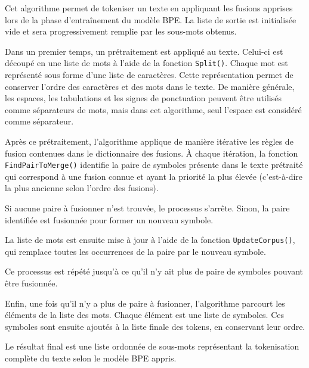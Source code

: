 \documentclass[12pt,a4paper]{report}
\begin{document}
Cet algorithme permet de tokeniser un texte en appliquant les fusions apprises lors de la phase d’entraînement du modèle BPE. La liste de sortie est initialisée vide et sera progressivement remplie par les sous-mots obtenus.

Dans un premier temps, un prétraitement est appliqué au texte. Celui-ci est découpé en une liste de mots à l’aide de la fonction \texttt{Split()}. Chaque mot est représenté sous forme d’une liste de caractères. Cette représentation permet de conserver l’ordre des caractères et des mots dans le texte. De manière générale, les espaces, les tabulations et les signes de ponctuation peuvent être utilisés comme séparateurs de mots, mais dans cet algorithme, seul l’espace est considéré comme séparateur.

Après ce prétraitement, l’algorithme applique de manière itérative les règles de fusion contenues dans le dictionnaire des fusions. À chaque itération, la fonction \texttt{FindPairToMerge()} identifie la paire de symboles présente dans le texte prétraité qui correspond à une fusion connue et ayant la priorité la plus élevée (c’est-à-dire la plus ancienne selon l’ordre des fusions).

Si aucune paire à fusionner n’est trouvée, le processus s’arrête. Sinon, la paire identifiée est fusionnée pour former un nouveau symbole.

La liste de mots est ensuite mise à jour à l’aide de la fonction \texttt{UpdateCorpus()}, qui remplace toutes les occurrences de la paire par le nouveau symbole.

Ce processus est répété jusqu’à ce qu’il n’y ait plus de paire de symboles pouvant être fusionnée.

Enfin, une fois qu'il n'y a plus de paire à fusionner, l’algorithme parcourt les éléments de la liste des mots. Chaque élément est une liste de symboles. Ces symboles sont ensuite ajoutés à la liste finale des tokens, en conservant leur ordre.

Le résultat final est une liste ordonnée de sous-mots représentant la tokenisation complète du texte selon le modèle BPE appris.
\end{document}
